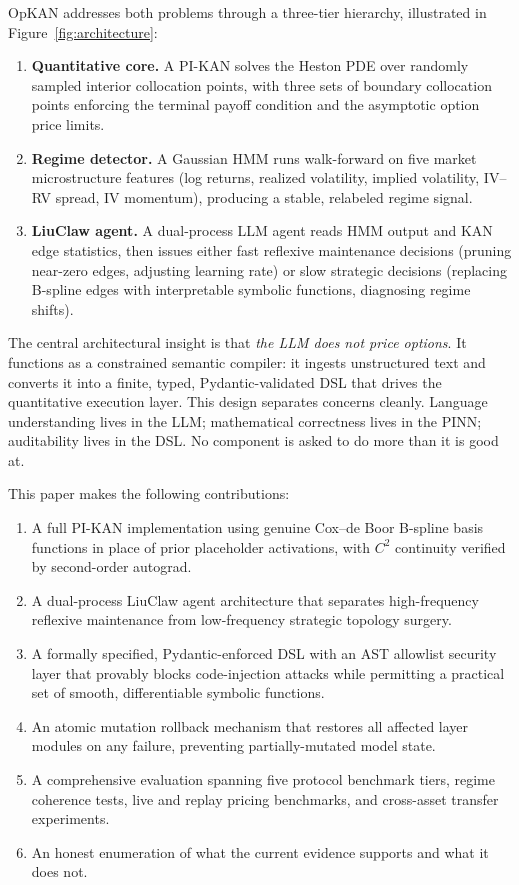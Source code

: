 \documentclass[11pt,a4paper]{article}
\begin{document}
OpKAN addresses both problems through a three-tier hierarchy, illustrated in Figure~\ref{fig:architecture}:
\begin{enumerate}
  \item \textbf{Quantitative core.} A PI-KAN solves the Heston PDE over randomly sampled interior collocation points, with three sets of boundary collocation points enforcing the terminal payoff condition and the asymptotic option price limits.
  \item \textbf{Regime detector.} A Gaussian HMM runs walk-forward on five market microstructure features (log returns, realized volatility, implied volatility, IV--RV spread, IV momentum), producing a stable, relabeled regime signal.
  \item \textbf{LiuClaw agent.} A dual-process LLM agent reads HMM output and KAN edge statistics, then issues either fast reflexive maintenance decisions (pruning near-zero edges, adjusting learning rate) or slow strategic decisions (replacing B-spline edges with interpretable symbolic functions, diagnosing regime shifts).
\end{enumerate}

The central architectural insight is that \emph{the LLM does not price options}. It functions as a constrained semantic compiler: it ingests unstructured text and converts it into a finite, typed, Pydantic-validated DSL that drives the quantitative execution layer. This design separates concerns cleanly. Language understanding lives in the LLM; mathematical correctness lives in the PINN; auditability lives in the DSL. No component is asked to do more than it is good at.

This paper makes the following contributions:
\begin{enumerate}
  \item A full PI-KAN implementation using genuine Cox--de Boor B-spline basis functions in place of prior placeholder activations, with $C^2$ continuity verified by second-order autograd.
  \item A dual-process LiuClaw agent architecture that separates high-frequency reflexive maintenance from low-frequency strategic topology surgery.
  \item A formally specified, Pydantic-enforced DSL with an AST allowlist security layer that provably blocks code-injection attacks while permitting a practical set of smooth, differentiable symbolic functions.
  \item An atomic mutation rollback mechanism that restores all affected layer modules on any failure, preventing partially-mutated model state.
  \item A comprehensive evaluation spanning five protocol benchmark tiers, regime coherence tests, live and replay pricing benchmarks, and cross-asset transfer experiments.
  \item An honest enumeration of what the current evidence supports and what it does not.
\end{enumerate}
\end{document}
